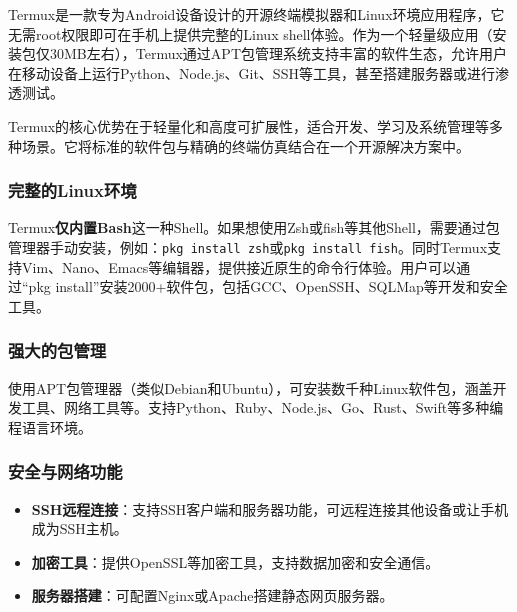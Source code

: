 


Termux是一款专为Android设备设计的开源终端模拟器和Linux环境应用程序，它无需root权限即可在手机上提供完整的Linux shell体验。作为一个轻量级应用（安装包仅30MB左右），Termux通过APT包管理系统支持丰富的软件生态，允许用户在移动设备上运行Python、Node.js、Git、SSH等工具，甚至搭建服务器或进行渗透测试。

Termux的核心优势在于轻量化和高度可扩展性，适合开发、学习及系统管理等多种场景。它将标准的软件包与精确的终端仿真结合在一个开源解决方案中。


\subsubsection*{完整的Linux环境}

Termux\textbf{仅内置Bash}这一种Shell。如果想使用Zsh或fish等其他Shell，需要通过包管理器手动安装，例如：\texttt{pkg install zsh}或\texttt{pkg install fish}。同时Termux支持Vim、Nano、Emacs等编辑器，提供接近原生的命令行体验。用户可以通过“pkg install”安装2000+软件包，包括GCC、OpenSSH、SQLMap等开发和安全工具。

\subsubsection*{强大的包管理}

使用APT包管理器（类似Debian和Ubuntu），可安装数千种Linux软件包，涵盖开发工具、网络工具等。支持Python、Ruby、Node.js、Go、Rust、Swift等多种编程语言环境。

\subsubsection*{安全与网络功能}

\begin{itemize}
  \item \textbf{SSH远程连接}：支持SSH客户端和服务器功能，可远程连接其他设备或让手机成为SSH主机。
  \item \textbf{加密工具}：提供OpenSSL等加密工具，支持数据加密和安全通信。
  \item \textbf{服务器搭建}：可配置Nginx或Apache搭建静态网页服务器。
\end{itemize}

